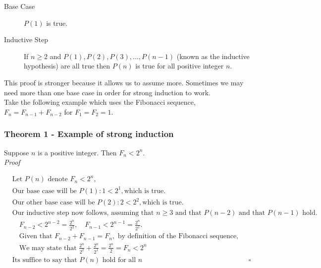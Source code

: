 \documentclass{article}
\begin{document}
            \begin{description}
                \item [Base Case] $P(1)$ is true.
                \item [Inductive Step] If $n\geq 2$ and $P(1), P(2), P(3), \dots, P(n-1)$ (known as the inductive hypothesis) are all true then $P(n)$ is true for all positive integer $n$.
            \end{description} 

            This proof is stronger because it allows us to assume more. Sometimes we may need more than one base case in order for strong induction to work.\\

            Take the following example which uses the Fibonacci sequence, $F_n = F_{n-1} + F_{n-2}$ for $F_1 = F_2 = 1$.

            \subsubsection{Theorem 1 - Example of strong induction}
                Suppose $n$ is a positive integer. Then $F_n < 2^n$.\\
                
               \textit{Proof}

                \begin{align*}
                    &\text{Let } P(n) \text{ denote } F_n < 2^n,\\
                    &\text{Our base case will be } P(1) : 1 < 2^1, \text{which is true}.\\
                    &\text{Our other base case will be }  P(2) : 2 < 2^2, \text{which is true}.\\
                    &\text{Our inductive step now follows, assuming that } n \geq 3 \text{ and that } P(n-2) \text{ and that } P(n-1) \text{ hold}.\\
                    &\quad F_{n-2} < 2^{n-2} = \frac{2^n}{2^2},\quad F_{n-1} < 2^{n-1} = \frac{2^n}{2^1}.\\
                    &\quad \text{Given that }F_{n-2} + F_{n-1} = F_n,\text{ by definition of the Fibonacci sequence},\\
                    &\quad \text{We may state that } \frac{2^n}{2^2} + \frac{2^n}{2^1} = \frac{2^n}{2} = F_n < 2^n\\
                    &\text{Its suffice to say that }P(n) \text{ hold for all }n & \square \\
                \end{align*}
\end{document}
